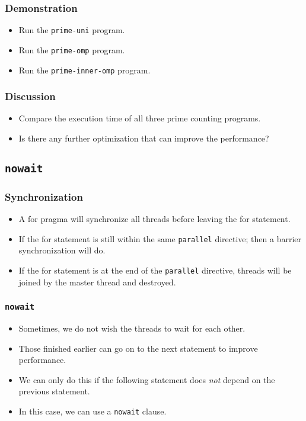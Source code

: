 \documentclass{beamer}
\begin{document}
\begin{frame}
  \frametitle{Demonstration}
  \begin{itemize}
  \item Run the {\tt prime-uni} program.
  \item Run the {\tt prime-omp} program.
  \item Run the {\tt prime-inner-omp} program.
  \end{itemize}
\end{frame}

\begin{frame}
  \frametitle{Discussion}
  \begin{itemize}
  \item Compare the execution time of all three prime counting
    programs.
  \item Is there any further optimization that can improve the
    performance?
  \end{itemize}
\end{frame}

\subsection{\tt nowait}

\begin{frame}
\frametitle{Synchronization}
\begin{itemize}
\item A for pragma will synchronize all threads before leaving the
  for statement.
\item If the for statement is still within the same {\tt parallel} directive; then a barrier synchronization will do.
\item If the for statement is at the end of the {\tt parallel} directive, threads will be joined by the master thread and destroyed.
\end{itemize}
\end{frame}

\begin{frame}
\frametitle{\tt nowait}
\begin{itemize}
\item Sometimes, we do not wish the threads to wait for each other.
\item Those finished earlier can go on to the next statement to improve
  performance.
\item We can only do this if the following statement does {\em not}
  depend on the previous statement.
\item In this case, we can use a {\tt nowait} clause.
\end{itemize}
\end{frame}
\end{document}
